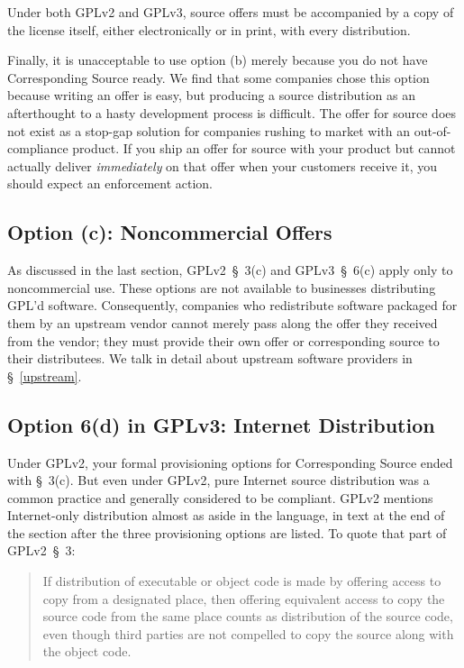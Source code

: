 Under both GPLv2 and GPLv3, source offers must be accompanied by a copy of
the license itself, either electronically or in print, with every
distribution.
 
Finally, it is unacceptable to use option (b) merely because you do not have
Corresponding Source ready.  We find that some companies chose this option
because writing an offer is easy, but producing a source distribution as
an afterthought to a hasty development process is difficult.  The offer
for source does not exist as a stop-gap solution for companies rushing to
market with an out-of-compliance product.  If you ship an offer for source
with your product but cannot actually deliver \emph{immediately} on that
offer when your customers receive it, you should expect an enforcement
action.

\subsection{Option (c): Noncommercial Offers}

As discussed in the last section, GPLv2~\S~3(c) and GPLv3~\S~6(c) apply
only to noncommercial use.  These options are not available to businesses
distributing GPL'd software.  Consequently, companies who redistribute
software packaged for them by an upstream vendor cannot merely pass along
the offer they received from the vendor; they must provide their own offer
or corresponding source to their distributees.  We talk in detail about
upstream software providers in \S~\ref{upstream}.

\subsection{Option 6(d) in GPLv3: Internet Distribution}

Under GPLv2, your formal provisioning options for Corresponding Source
ended with \S~3(c).  But even under GPLv2, pure Internet source
distribution was a common practice and generally considered to be
compliant.  GPLv2 mentions Internet-only distribution almost as aside in
the language, in text at the end of the section after the three
provisioning options are listed.  To quote that part of GPLv2~\S~3:
\begin{quote}
If distribution of executable or object code is made by offering access to
copy from a designated place, then offering equivalent access to copy the
source code from the same place counts as distribution of the source code,
even though third parties are not compelled to copy the source along with
the object code.
\end{quote}


